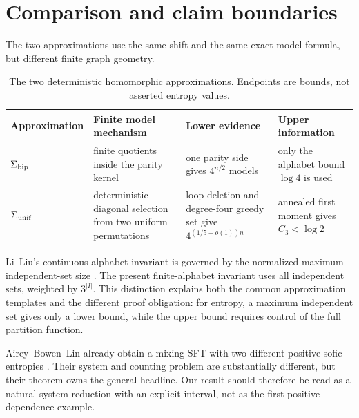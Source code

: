 \section{Comparison and claim boundaries}\label{sec:scope}

The two approximations use the same shift and the same exact model formula,
but different finite graph geometry.

\begin{table}[ht]
\centering
\caption{The two deterministic homomorphic approximations.  Endpoints are
bounds, not asserted entropy values.}\label{tab:approximations}
\begin{tabularx}{\textwidth}{@{}>{\raggedright\arraybackslash}p{}
>{\raggedright\arraybackslash}p{}
>{\raggedright\arraybackslash}p{}Y@{}}
\toprule
Approximation & Finite model mechanism & Lower evidence & Upper information\\
\midrule
$\Sigma_{\mathrm{bip}}$ & finite quotients inside the parity kernel & one parity side gives $4^{n/2}$ models & only the alphabet bound $\log4$ is used\\
$\Sigma_{\mathrm{unif}}$ & deterministic diagonal selection from two uniform permutations & loop deletion and degree-four greedy set give $4^{(1/5-o(1))n}$ & annealed first moment gives $C_3<\log2$\\
\bottomrule
\end{tabularx}
\end{table}

Li--Liu's continuous-alphabet invariant is governed by the normalized maximum
independent-set size \citep{LiLiu2026}.  The present finite-alphabet invariant
uses all independent sets, weighted by $3^{|I|}$.  This distinction explains
both the common approximation templates and the different proof obligation:
for entropy, a maximum independent set gives only a lower bound, while the
upper bound requires control of the full partition function.

Airey--Bowen--Lin already obtain a mixing SFT with two different positive
sofic entropies \citep{AireyBowenLin2022}.  Their system and counting problem
are substantially different, but their theorem owns the general headline.
Our result should therefore be read as a natural-system reduction with an
explicit interval, not as the first positive-dependence example.

